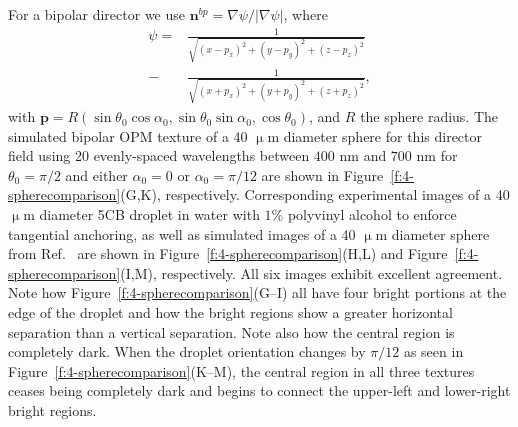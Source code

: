 For a bipolar director we use $\mathbf{n}^{bp} = \nabla \psi/|\nabla \psi|$, where
\begin{align}
\psi =& \frac{1}{\sqrt{(x-p_x)^2+(y-p_y)^2+(z-p_z)^2}} \nonumber \\
      -& \frac{1}{\sqrt{(x+p_x)^2+(y+p_y)^2+(z+p_z)^2}}, \label{e:4-bipolar_pot}
\end{align}
with $\mathbf{p} = R(\sin \theta_0\cos\alpha_0,\sin \theta_0\sin\alpha_0,\cos\theta_0) $, and $R$ the sphere radius.
The simulated bipolar OPM texture of a 40 $\upmu$m diameter sphere for this director field using 20 evenly-spaced wavelengths between $400$ nm and $700$ nm for $\theta_0 = \pi/2$ and either $\alpha_0 = 0$ or $\alpha_0 = \pi/12$ are shown in Figure~\ref{f:4-spherecomparison}(G,K), respectively.
Corresponding experimental images of a 40 $\upmu$m diameter 5CB droplet in water with $1\%$ polyvinyl alcohol to enforce tangential anchoring, as well as simulated images of a 40 $\upmu$m diameter sphere from Ref.~\cite{RN310} are shown in Figure~\ref{f:4-spherecomparison}(H,L) and Figure~\ref{f:4-spherecomparison}(I,M), respectively.
All six images exhibit excellent agreement.
Note how Figure~\ref{f:4-spherecomparison}(G--I) all have four bright portions at the edge of the droplet and how the bright regions show a greater horizontal separation than a vertical separation.
Note also how the central region is completely dark.
When the droplet orientation changes by $\pi/12$ as seen in Figure~\ref{f:4-spherecomparison}(K--M), the central region in all three textures ceases being completely dark and begins to connect the upper-left and lower-right bright regions.

